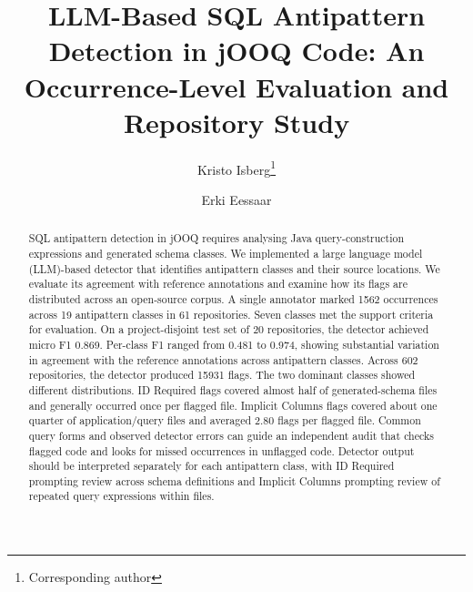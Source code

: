\documentclass[smallextended,natbib]{../template/svjour3}
\begin{document}
\title{LLM-Based SQL Antipattern Detection in jOOQ Code: An Occurrence-Level Evaluation and Repository Study}

\author{Kristo Isberg\thanks{Corresponding author} \and Erki Eessaar}


\date{}
\maketitle

\begin{abstract}
SQL antipattern detection in jOOQ requires analysing Java query-construction expressions and generated schema classes. We implemented a large language model (LLM)-based detector that identifies antipattern classes and their source locations. We evaluate its agreement with reference annotations and examine how its flags are distributed across an open-source corpus. A single annotator marked \num{1562} occurrences across 19 antipattern classes in 61 repositories. Seven classes met the support criteria for evaluation. On a project-disjoint test set of 20 repositories, the detector achieved micro F1 \num{0.869}. Per-class F1 ranged from \num{0.481} to \num{0.974}, showing substantial variation in agreement with the reference annotations across antipattern classes. Across 602 repositories, the detector produced \num{15931} flags. The two dominant classes showed different distributions. ID Required flags covered almost half of generated-schema files and generally occurred once per flagged file. Implicit Columns flags covered about one quarter of application/query files and averaged \num{2.80} flags per flagged file. Common query forms and observed detector errors can guide an independent audit that checks flagged code and looks for missed occurrences in unflagged code. Detector output should be interpreted separately for each antipattern class, with ID Required prompting review across schema definitions and Implicit Columns prompting review of repeated query expressions within files.
\end{abstract}
\end{document}
